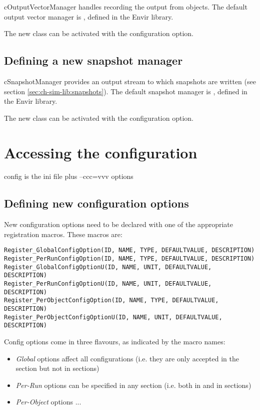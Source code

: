 cOutputVectorManager handles recording the output from  objects.
The default output vector manager is ,
defined in the Envir library.

The new class can be activated with the 
configuration option.


\subsection{Defining a new snapshot manager}
\label{sec:plugin-exts:snapshotmanager}

cSnapshotManager provides an output stream to which snapshots are written
(see section \ref{sec:ch-sim-lib:snapshots}). The default snapshot manager
is , defined in the Envir library.

The new class can be activated with the 
configuration option.


\section{Accessing the configuration}
\label{sec:plugin-exts:accessing-config}

config is the ini file plus --ccc=vvv options

\subsection{Defining new configuration options}

New configuration options need to be declared with one of the appropriate
registration macros. These macros are:

\begin{verbatim}
Register_GlobalConfigOption(ID, NAME, TYPE, DEFAULTVALUE, DESCRIPTION)
Register_PerRunConfigOption(ID, NAME, TYPE, DEFAULTVALUE, DESCRIPTION)
Register_GlobalConfigOptionU(ID, NAME, UNIT, DEFAULTVALUE, DESCRIPTION)
Register_PerRunConfigOptionU(ID, NAME, UNIT, DEFAULTVALUE, DESCRIPTION)
Register_PerObjectConfigOption(ID, NAME, TYPE, DEFAULTVALUE, DESCRIPTION)
Register_PerObjectConfigOptionU(ID, NAME, UNIT, DEFAULTVALUE, DESCRIPTION)
\end{verbatim}

Config options come in three flavours, as indicated by the macro names:

\begin{itemize}
  \item \textit{Global} options affect all configurations (i.e. they are
      only accepted in the \ttt{[General]} section but not in
       sections)
  \item \textit{Per-Run} options can be specified in any section
      (i.e. both in \ttt{[General]} and in  sections)
  \item \textit{Per-Object} options ...
\end{itemize}

